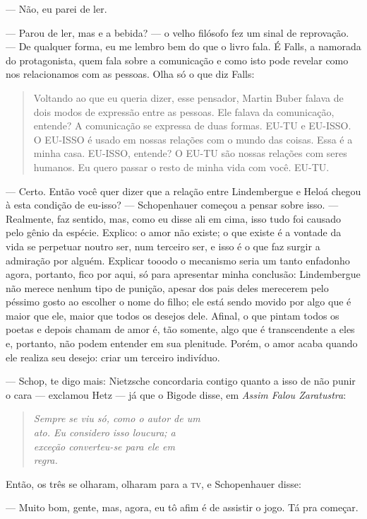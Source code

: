 --- Não, eu parei de ler.

--- Parou de ler, mas e a bebida? --- o velho filósofo fez um sinal de reprovação. --- De qualquer forma, eu me lembro bem do que o livro fala. É Falls, a namorada do protagonista, quem fala sobre a comunicação e como isto pode revelar como nos relacionamos com as pessoas. Olha só o que diz Falls:

\begin{quotation}
Voltando ao que eu queria dizer, esse pensador, Martin Buber falava de dois modos de expressão entre as pessoas. Ele falava da comunicação, entende? A comunicação se expressa de duas formas. EU-TU e EU-ISSO. O EU-ISSO é usado em nossas relações com o mundo das coisas. Essa é a minha casa. EU-ISSO, entende? O EU-TU são nossas relações com seres humanos. Eu quero passar o resto de minha vida com você. EU-TU.
\end{quotation}

--- Certo. Então você quer dizer que a relação entre Lindembergue e Heloá chegou à esta condição de eu-isso? --- Schopenhauer começou a pensar sobre isso. --- Realmente, faz sentido, mas, como eu disse ali em cima, isso tudo foi causado pelo gênio da espécie. Explico: o amor não existe; o que existe é a vontade da vida se perpetuar noutro ser, num terceiro ser, e isso é o que faz surgir a admiração por alguém. Explicar tooodo o mecanismo seria um tanto enfadonho agora, portanto, fico por aqui, só para apresentar minha conclusão: Lindembergue não merece nenhum tipo de punição, apesar dos pais deles merecerem pelo péssimo gosto ao escolher o nome do filho; ele está sendo movido por algo que é maior que ele, maior que todos os desejos dele. Afinal, o que pintam todos os poetas e depois chamam de amor é, tão somente, algo que é transcendente a eles e, portanto, não podem entender em sua plenitude. Porém, o amor acaba quando ele realiza seu desejo: criar um terceiro indivíduo.

\begin{sloppypar}
--- Schop, te digo mais: Nietzsche concordaria contigo quanto a isso de não punir o cara --- exclamou Hetz --- já que o Bigode disse, em \emph{Assim Falou Zaratustra}:
\end{sloppypar}

\begin{verse}
\emph{
Sempre se viu só, como o autor de um \\
ato. Eu considero isso loucura; a \\
exceção converteu-se para ele em \\
regra. \\
}
\end{verse}

Então, os três se olharam, olharam para a \textsc{tv}, e Schopenhauer disse:

--- Muito bom, gente, mas, agora, eu tô afim é de assistir o jogo. Tá pra começar.
